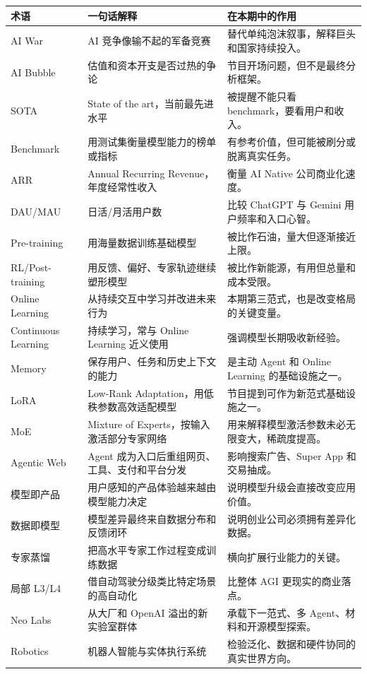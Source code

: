 \documentclass[a4paper]{article}
\begin{document}
\begin{longtable}{p{}p{}p{}}
\toprule
术语 & 一句话解释 & 在本期中的作用 \\
\midrule
AI War & AI 竞争像输不起的军备竞赛 & 替代单纯泡沫叙事，解释巨头和国家持续投入。 \\
AI Bubble & 估值和资本开支是否过热的争论 & 节目开场问题，但不是最终分析框架。 \\
SOTA & State of the art，当前最先进水平 & 被提醒不能只看 benchmark，要看用户和收入。 \\
Benchmark & 用测试集衡量模型能力的榜单或指标 & 有参考价值，但可能被刷分或脱离真实任务。 \\
ARR & Annual Recurring Revenue，年度经常性收入 & 衡量 AI Native 公司商业化速度。 \\
DAU/MAU & 日活/月活用户数 & 比较 ChatGPT 与 Gemini 用户频率和入口心智。 \\
Pre-training & 用海量数据训练基础模型 & 被比作石油，量大但逐渐接近上限。 \\
RL/Post-training & 用反馈、偏好、专家轨迹继续塑形模型 & 被比作新能源，有用但总量和成本受限。 \\
Online Learning & 从持续交互中学习并改进未来行为 & 本期第三范式，也是改变格局的关键变量。 \\
Continuous Learning & 持续学习，常与 Online Learning 近义使用 & 强调模型长期吸收新经验。 \\
Memory & 保存用户、任务和历史上下文的能力 & 是主动 Agent 和 Online Learning 的基础设施之一。 \\
LoRA & Low-Rank Adaptation，用低秩参数高效适配模型 & 节目提到可作为新范式基础设施之一。 \\
MoE & Mixture of Experts，按输入激活部分专家网络 & 用来解释模型激活参数未必无限变大，稀疏度提高。 \\
Agentic Web & Agent 成为入口后重组网页、工具、支付和平台分发 & 影响搜索广告、Super App 和交易抽成。 \\
模型即产品 & 用户感知的产品体验越来越由模型能力决定 & 说明模型升级会直接改变应用价值。 \\
数据即模型 & 模型差异最终来自数据分布和反馈闭环 & 说明创业公司必须拥有差异化数据。 \\
专家蒸馏 & 把高水平专家工作过程变成训练数据 & 横向扩展行业能力的关键。 \\
局部 L3/L4 & 借自动驾驶分级类比特定场景的高自动化 & 比整体 AGI 更现实的商业落点。 \\
Neo Labs & 从大厂和 OpenAI 溢出的新实验室群体 & 承载下一范式、多 Agent、材料和开源模型探索。 \\
Robotics & 机器人智能与实体执行系统 & 检验泛化、数据和硬件协同的真实世界方向。 \\
\bottomrule
\end{longtable}
\end{document}
